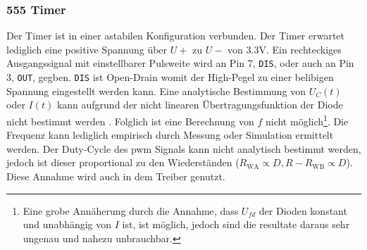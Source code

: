 \subsubsection{555 Timer}

Der Timer ist in einer astabilen Konfiguration verbunden.
Der Timer erwartet lediglich eine positive Spannung über $U+$ zu $U-$ von $3.3\si{\volt}$.
Ein rechteckiges Ausgangssignal mit einstellbarer Pulsweite wird an Pin 7, \texttt{DIS}, oder auch an Pin 3, \texttt{OUT}, gegben.
\texttt{DIS} ist Open-Drain womit der High-Pegel zu einer belibigen Spannung eingestellt werden kann.
Eine analytische Bestimmung von $U_C(t)$ oder $I(t)$ kann aufgrund der nicht linearen Übertragungsfunktion der Diode nicht bestimmt werden \autocite{rdc}.
Folglich ist eine Berechnung von $f$ nicht möglich\footnote{Eine grobe Annäherung durch die Annahme, dass $U_{fd}$ der Dioden konstant und unabhängig von $I$ ist, ist möglich, jedoch sind die resultate daraus sehr ungenau und nahezu unbrauchbar.}.
Die Frequenz kann lediglich empirisch durch Messung oder Simulation ermittelt werden.
Der Duty-Cycle des \gls{pwm} Signals kann nicht analytisch bestimmt werden, jedoch ist dieser proportional zu den Wiederständen ($R_{\text{WA}} \propto D, R - R_{\text{WB}} \propto D$).
Diese Annahme wird auch in dem Treiber genutzt.

